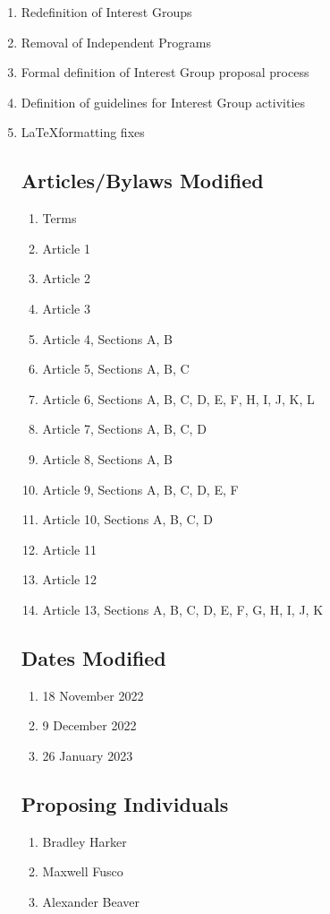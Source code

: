 \begin{enumerate}
      \item Redefinition of Interest Groups
      \item Removal of Independent Programs
      \item Formal definition of Interest Group proposal process
      \item Definition of guidelines for Interest Group activities
      \item \LaTeX\space formatting fixes

            \subsection{Articles/Bylaws Modified}
            \begin{enumerate}
                  \item Terms
                  \item Article 1
                  \item Article 2
                  \item Article 3
                  \item Article 4, Sections A, B
                  \item Article 5, Sections A, B, C
                  \item Article 6, Sections A, B, C, D, E, F, H, I, J, K, L
                  \item Article 7, Sections A, B, C, D
                  \item Article 8, Sections A, B
                  \item Article 9, Sections A, B, C, D, E, F
                  \item Article 10, Sections A, B, C, D
                  \item Article 11
                  \item Article 12
                  \item Article 13, Sections A, B, C, D, E, F, G, H, I, J, K
            \end{enumerate}

            \subsection{Dates Modified}
            \begin{enumerate}
                  \item 18 November 2022
                  \item 9 December 2022
                  \item 26 January 2023
            \end{enumerate}

            \subsection{Proposing Individuals}
            \begin{enumerate}
                  \item Bradley Harker
                  \item Maxwell Fusco
                  \item Alexander Beaver
            \end{enumerate}
\end{enumerate}